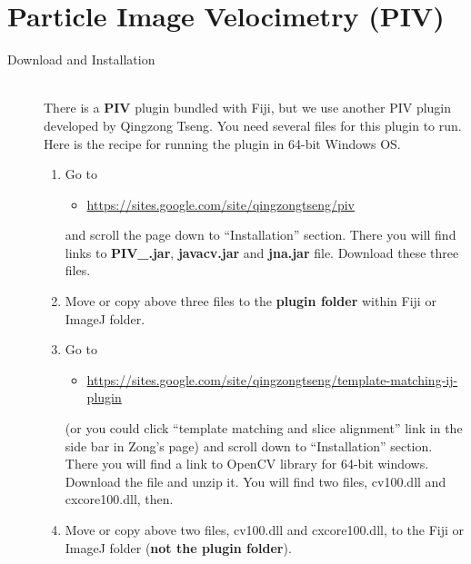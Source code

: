\documentclass[11pnt]{article}
\begin{document}
\section{Particle Image Velocimetry (PIV)}

\begin{description}
\item[Download and Installation]\hfill\\

There is a \textbf{PIV} plugin bundled with Fiji, but we use another PIV plugin developed by Qingzong Tseng. You need several files for this plugin to run. Here is the recipe for running the plugin in 64-bit Windows OS. 
 
\begin{enumerate}
\item Go to 
\begin{itemize}
\item\url{https://sites.google.com/site/qingzongtseng/piv} 
\end{itemize}
and scroll the page down to ``Installation'' section. There you will find links to \textbf{PIV\_.jar}, \textbf{javacv.jar} and \textbf{jna.jar} file. Download these three files.

\item Move or copy above three files to the \textbf{plugin folder} within Fiji or ImageJ folder. 

\item Go to 
\begin{itemize}
\item\url{https://sites.google.com/site/qingzongtseng/template-matching-ij-plugin} 
\end{itemize}
(or you could click ``template matching and slice alignment'' link in the side bar in Zong's page) and scroll down to ``Installation'' section. There you will find a link to OpenCV library for 64-bit windows. Download the file and unzip it. You will find two files, cv100.dll and cxcore100.dll, then. 

\item Move or copy above two files, cv100.dll and cxcore100.dll, to the Fiji or ImageJ folder (\textbf{not the plugin folder}).


\end{enumerate}
\end{description}
\end{document}
